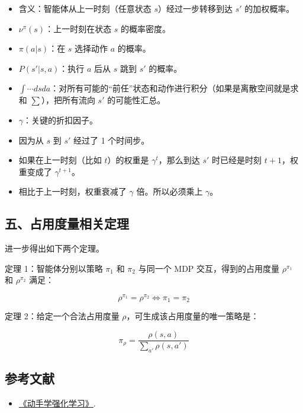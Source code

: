 \begin{itemize}
\tightlist
\item
  含义：智能体从上一时刻（任意状态 \(s\)）经过一步转移到达 \(s'\) 的加权概率。
\item
  \(\nu^\pi(s)\)：上一时刻在状态 \(s\) 的概率密度。
\item
  \(\pi(a|s)\)：在 \(s\) 选择动作 \(a\) 的概率。
\item
  \(P(s'|s,a)\)：执行 \(a\) 后从 \(s\) 跳到 \(s'\) 的概率。
\item
  \(\int \cdots dsda\)：对所有可能的``前任''状态和动作进行积分（如果是离散空间就是求和 \(\sum\)），把所有流向 \(s'\) 的可能性汇总。
\item
  \(\gamma\)：关键的折扣因子。
\item
  因为从 \(s\) 到 \(s'\) 经过了 1 个时间步。
\item
  如果在上一时刻（比如 \(t\)）的权重是 \(\gamma^t\)，那么到达 \(s'\) 时已经是时刻 \(t+1\)，权重变成了 \(\gamma^{t+1}\)。
\item
  相比于上一时刻，权重衰减了 \(\gamma\) 倍。所以必须乘上 \(\gamma\)。
\end{itemize}

\hypertarget{ux4e94ux5360ux7528ux5ea6ux91cfux76f8ux5173ux5b9aux7406}{%
\subsection{五、占用度量相关定理}\label{ux4e94ux5360ux7528ux5ea6ux91cfux76f8ux5173ux5b9aux7406}}

进一步得出如下两个定理。

定理 1：智能体分别以策略 \(\pi_1\) 和 \(\pi_2\) 与同一个 MDP 交互，得到的占用度量 \(\rho^{\pi_1}\) 和 \(\rho^{\pi_2}\) 满足：

\[
\rho^{\pi_1} = \rho^{\pi_2} \Longleftrightarrow \pi_1 = \pi_2
\]

定理 2：给定一个合法占用度量 \(\rho\)，可生成该占用度量的唯一策略是：

\[
\pi_\rho = \frac{\rho(s,a)}{\sum_{a'}\rho(s,a')}
\]

\hypertarget{ux53c2ux8003ux6587ux732e-42}{%
\subsection{参考文献}\label{ux53c2ux8003ux6587ux732e-42}}

\begin{itemize}
\tightlist
\item
  \href{https://hrl.boyuai.com/}{《动手学强化学习》}.
\end{itemize}

